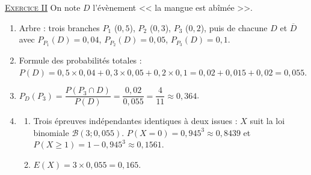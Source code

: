 \begin{corrige}
\noindent \underline{\textsc{Exercice II}} \newline
On note $D$ l'\'ev\`enement << la mangue est ab\^im\'ee >>.
\begin{enumerate}
\item Arbre : trois branches $P_1$ ($0{,}5$), $P_2$ ($0{,}3$), $P_3$ ($0{,}2$), puis de chacune $D$ et $\overline{D}$ avec
      $P_{P_1}(D) = 0{,}04$, $P_{P_2}(D) = 0{,}05$, $P_{P_3}(D) = 0{,}1$.
\item Formule des probabilit\'es totales : $P(D) = 0{,}5 \times 0{,}04 + 0{,}3 \times 0{,}05 + 0{,}2 \times 0{,}1 = 0{,}02 + 0{,}015 + 0{,}02 = 0{,}055$.
\item $P_D(P_3) = \dfrac{P(P_3 \cap D)}{P(D)} = \dfrac{0{,}02}{0{,}055} = \dfrac{4}{11} \approx 0{,}364$.
\item \begin{enumerate}
      \item Trois \'epreuves ind\'ependantes identiques \`a deux issues : $X$ suit la loi binomiale $\mathscr{B}(3 ; 0{,}055)$.
            $P(X = 0) = 0{,}945^3 \approx 0{,}8439$ et $P(X \geq 1) = 1 - 0{,}945^3 \approx 0{,}1561$.
      \item $E(X) = 3 \times 0{,}055 = 0{,}165$.
      \end{enumerate}
\end{enumerate}


\end{corrige}
